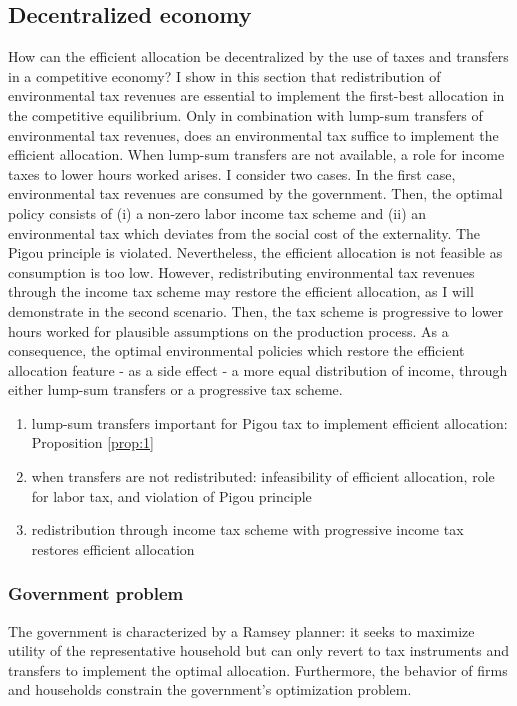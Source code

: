 \subsection{Decentralized economy}

How can the efficient allocation be decentralized by the use of taxes and transfers in a competitive economy? %
I show in this section that redistribution of environmental tax revenues are essential to implement the first-best allocation in the competitive equilibrium. Only in combination with lump-sum transfers of  environmental tax revenues, does an environmental tax suffice to implement the efficient allocation. 
When lump-sum transfers are not available, a role for income taxes to lower hours worked arises. I consider two cases.
In the first case, environmental tax revenues are consumed by the government. Then, the optimal policy consists of (i) a non-zero labor income tax scheme and (ii) an environmental tax which deviates from the social cost of the externality. The Pigou principle is violated. Nevertheless, the efficient allocation is not feasible as consumption is too low.
However, redistributing environmental tax revenues through the income tax scheme may restore the efficient allocation, as I will demonstrate in the second scenario. Then, the tax scheme is progressive to lower hours worked for plausible assumptions on the production process.
As a consequence, the optimal environmental policies which restore the efficient allocation feature - as a side effect - a more equal distribution of income, through either lump-sum transfers or a progressive tax scheme.%

\begin{enumerate}
\item lump-sum transfers important for Pigou tax to implement efficient allocation: Proposition \ref{prop:1}
\item when transfers are not redistributed: infeasibility of efficient allocation,  role for labor tax, and violation of Pigou principle
\item redistribution through income tax scheme with progressive income tax restores efficient allocation
\end{enumerate}

\subsubsection{Government problem}
The government is characterized by a Ramsey planner: it seeks to maximize utility of the representative household but can only revert to tax instruments and transfers to implement the optimal allocation. Furthermore, the behavior of firms and households constrain the government's optimization problem. 

